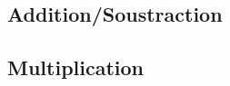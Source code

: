 \subsection*{Addition/Soustraction}


\pagebreak


\pagebreak
\subsection*{Multiplication}




\pagebreak

